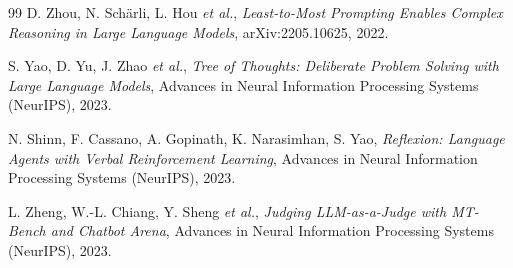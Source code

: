 \documentclass[12pt,a4paper]{article}
\begin{document}
\begin{thebibliography}{99}
 D. Zhou, N. Schärli, L. Hou \emph{et al.}, \emph{Least-to-Most Prompting Enables Complex Reasoning in Large Language Models}, arXiv:2205.10625, 2022.

 S. Yao, D. Yu, J. Zhao \emph{et al.}, \emph{Tree of Thoughts: Deliberate Problem Solving with Large Language Models}, Advances in Neural Information Processing Systems (NeurIPS), 2023.

 N. Shinn, F. Cassano, A. Gopinath, K. Narasimhan, S. Yao, \emph{Reflexion: Language Agents with Verbal Reinforcement Learning}, Advances in Neural Information Processing Systems (NeurIPS), 2023.

 L. Zheng, W.-L. Chiang, Y. Sheng \emph{et al.}, \emph{Judging LLM-as-a-Judge with MT-Bench and Chatbot Arena}, Advances in Neural Information Processing Systems (NeurIPS), 2023.

\end{thebibliography}
\end{document}
